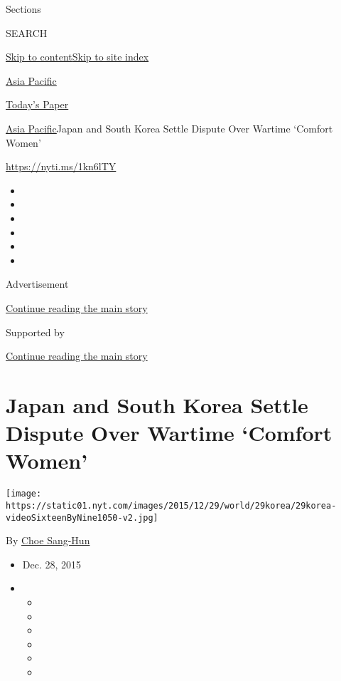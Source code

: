 Sections

SEARCH

\protect\hyperlink{site-content}{Skip to
content}\protect\hyperlink{site-index}{Skip to site index}

\href{https://www.nytimes.com/section/world/asia}{Asia Pacific}

\href{https://myaccount.nytimes.com/auth/login?response_type=cookie\&client_id=vi}{}

\href{https://www.nytimes.com/section/todayspaper}{Today's Paper}

\href{/section/world/asia}{Asia Pacific}\textbar{}Japan and South Korea
Settle Dispute Over Wartime `Comfort Women'

\url{https://nyti.ms/1kn6lTY}

\begin{itemize}
\item
\item
\item
\item
\item
\item
\end{itemize}

Advertisement

\protect\hyperlink{after-top}{Continue reading the main story}

Supported by

\protect\hyperlink{after-sponsor}{Continue reading the main story}

\hypertarget{japan-and-south-korea-settle-dispute-over-wartime-comfort-women}{%
\section{Japan and South Korea Settle Dispute Over Wartime `Comfort
Women'}\label{japan-and-south-korea-settle-dispute-over-wartime-comfort-women}}

\texttt{[image: https://static01.nyt.com/images/2015/12/29/world/29korea/29korea-videoSixteenByNine1050-v2.jpg]}

By \href{http://www.nytimes.com/by/choe-sang-hun}{Choe Sang-Hun}

\begin{itemize}
\item
  Dec. 28, 2015
\item
  \begin{itemize}
  \item
  \item
  \item
  \item
  \item
  \item
  \end{itemize}
\end{itemize}

